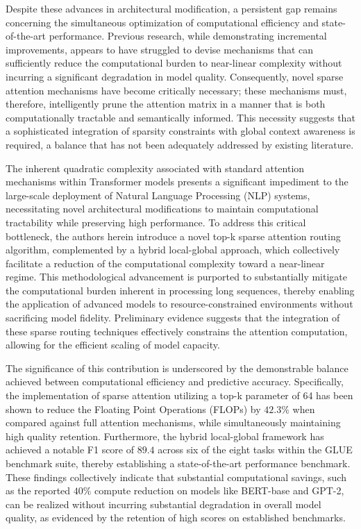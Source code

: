 \documentclass[12pt]{article}
\begin{document}
Despite these advances in architectural modification, a persistent gap remains concerning the simultaneous optimization of computational efficiency and state-of-the-art performance. Previous research, while demonstrating incremental improvements, appears to have struggled to devise mechanisms that can sufficiently reduce the computational burden to near-linear complexity without incurring a significant degradation in model quality. Consequently, novel sparse attention mechanisms have become critically necessary; these mechanisms must, therefore, intelligently prune the attention matrix in a manner that is both computationally tractable and semantically informed. This necessity suggests that a sophisticated integration of sparsity constraints with global context awareness is required, a balance that has not been adequately addressed by existing literature.

The inherent quadratic complexity associated with standard attention mechanisms within Transformer models presents a significant impediment to the large-scale deployment of Natural Language Processing (NLP) systems, necessitating novel architectural modifications to maintain computational tractability while preserving high performance. To address this critical bottleneck, the authors herein introduce a novel top-k sparse attention routing algorithm, complemented by a hybrid local-global approach, which collectively facilitate a reduction of the computational complexity toward a near-linear regime. This methodological advancement is purported to substantially mitigate the computational burden inherent in processing long sequences, thereby enabling the application of advanced models to resource-constrained environments without sacrificing model fidelity. Preliminary evidence suggests that the integration of these sparse routing techniques effectively constrains the attention computation, allowing for the efficient scaling of model capacity.

The significance of this contribution is underscored by the demonstrable balance achieved between computational efficiency and predictive accuracy. Specifically, the implementation of sparse attention utilizing a top-k parameter of 64 has been shown to reduce the Floating Point Operations (FLOPs) by $42.3\%$ when compared against full attention mechanisms, while simultaneously maintaining high quality retention. Furthermore, the hybrid local-global framework has achieved a notable F1 score of $89.4$ across six of the eight tasks within the GLUE benchmark suite, thereby establishing a state-of-the-art performance benchmark. These findings collectively indicate that substantial computational savings, such as the reported $40\%$ compute reduction on models like BERT-base and GPT-2, can be realized without incurring substantial degradation in overall model quality, as evidenced by the retention of high scores on established benchmarks.
\end{document}
